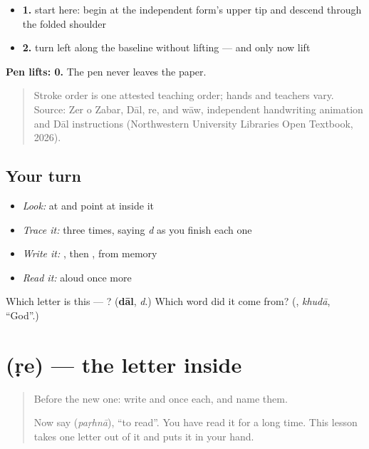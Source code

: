 \begin{itemize}
\raggedright
  \item \textbf{1.} start here: begin at the independent form's upper tip and descend through the folded shoulder
  \item \textbf{2.} turn left along the baseline without lifting — and only now lift
\end{itemize}

\textbf{Pen lifts: 0.} The pen never leaves the paper.

\begin{quote}
Stroke order is one attested teaching order; hands and teachers vary. Source: Zer o Zabar, Dāl, re, and wāw, independent  handwriting animation and Dāl instructions (Northwestern University Libraries Open Textbook, 2026).
\end{quote}

\subsection*{Your turn}
\begin{itemize}
\raggedright
  \item \emph{Look:} at \textbf{} and point at  inside it
  \item \emph{Trace it:}  three times, saying \emph{d} as you finish each one
  \item \emph{Write it:} , then , from memory
  \item \emph{Read it:} \textbf{} aloud once more
\end{itemize}

\begin{tcolorbox}[breakable,colback=teal!4,colframe=teal!35!black,title={Before you move on}]
Which letter is this — ? (\textbf{dāl}, \emph{d}.) Which word did it come from? (\textbf{}, \emph{khudā}, \textquotedblleft{}God\textquotedblright{}.)
\end{tcolorbox}
\section[\texorpdfstring{\ur{ڑ} (ṛe)}{ڑ (ṛe)}]{ (ṛe) — the letter inside }

\label{lesson:UR-W36-rre}



\begin{quote}
Before the new one: write  and  once each, and name them.

Now say \textbf{} (\emph{paṛhnā}), \textquotedblleft{}to read\textquotedblright{}. You have read it for a long time. This lesson takes one letter out of it and puts it in your hand.
\end{quote}

